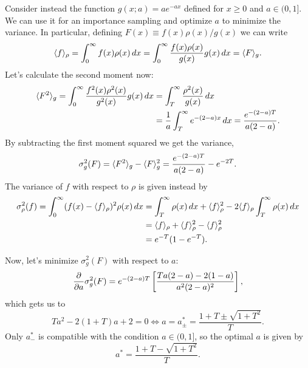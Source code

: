 \documentclass{gulartcl}
\begin{document}
Consider instead the function $g(x; a) = ae^{-ax}$ defined for $x \geq 0$ and $a
\in (0, 1]$. We can use it for an importance sampling and optimize $a$ to
minimize the variance. In particular, defining $F(x) \equiv f(x) \rho(x) / g(x)$
we can write
\begin{equation}
    \langle f\rangle_{\rho} = \int_{0}^{\infty} f(x) \rho(x) \, dx = 
    \int_{0}^{\infty} \frac{f(x)\rho(x)}{g(x)} g(x) \, dx = 
    \langle F\rangle_{g}.
\end{equation}
Let’s calculate the second moment now:
\begin{equation}
\begin{split}
    \langle F^{2}\rangle_{g} = \int_{0}^{\infty} \frac{f^{2}(x) \rho^2(x)}{g^{2}(x)}
    g(x) \, dx &= \int_{T}^{\infty} \frac{\rho^{2}(x)}{g(x)}\, dx \\
    &= \frac{1}{a} \int_{T}^{\infty} e^{-(2-a) x} \, dx =
    \frac{e^{-(2-a)T}}{a(2-a)}.
\end{split}
\end{equation}
By subtracting the first moment squared we get the variance,
\begin{equation}
    \sigma^{2}_g(F) = \langle F^{2}\rangle_g - \langle F\rangle_{g}^{2}
    = \frac{e^{-(2-a)T}}{a(2-a)} - e^{-2T}.
\end{equation}
The variance of $f$ with respect to $\rho$ is given instead by
\begin{equation}
\begin{split}
    \sigma^{2}_{\rho}(f)
    = \int_{0}^{\infty} (f(x) - \langle f\rangle_{\rho})^{2} \rho(x) \, dx
    &= \int_{T}^{\infty} \rho(x) \, dx + \langle f\rangle_{\rho}^{2}
        - 2 \langle f\rangle_{\rho} \int_{T}^{\infty} \rho(x) \, dx \\
    &= \langle f\rangle_{\rho} + \langle f\rangle^{2}_{\rho} - \langle f\rangle^{2}_{\rho} \\
    &= e^{-T}(1 - e^{-T}).
\end{split}
\end{equation}

Now, let’s minimize $\sigma^{2}_g(F)$ with respect to $a$:
\begin{equation}
    \pdiff{}{a} \sigma^{2}_{g}(F) = e^{-(2-a)T} \left[\frac{Ta(2-a) -
    2(1-a)}{a^{2}(2-a)^{2}}\right],
\end{equation}
which gets us to
\begin{equation}
    Ta^{2} - 2(1 + T) a + 2 = 0 \iff a = a^*_{\pm}
    = \frac{1 + T \pm \sqrt{1 + T^{2}}}{T}.
\end{equation}
Only $a^*_{-}$ is compatible with the condition $a \in (0, 1]$, so the optimal
$a$ is given by
\begin{equation}
    a^* = \frac{1 + T - \sqrt{1 + T^{2}}}{T}.
\end{equation}
\end{document}
